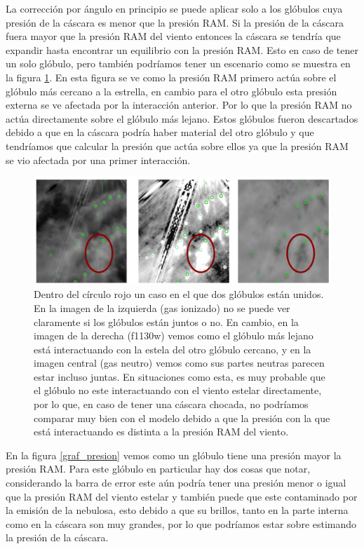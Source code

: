 \documentclass{book}
\begin{document}
La corrección por ángulo en principio se puede aplicar solo a los glóbulos cuya presión de la cáscara  es menor que la presión RAM. Si la presión de la cáscara fuera mayor que la presión RAM del viento entonces la cáscara se tendría que expandir hasta encontrar un equilibrio con la presión RAM. Esto en caso de tener un solo glóbulo, pero también podríamos tener un escenario como se muestra en la figura \ref{fig:multiples_glo}. En esta figura se ve como la presión RAM primero actúa sobre el glóbulo más cercano a la estrella, en cambio para el otro glóbulo esta presión externa se ve afectada por la interacción anterior. Por lo que la presión RAM no actúa directamente sobre el glóbulo más lejano. Estos glóbulos fueron descartados debido a que en la cáscara podría haber material del otro glóbulo y que tendríamos que calcular la presión que actúa sobre ellos ya que la presión RAM se vio afectada por una primer interacción.\\

\begin{figure}[htb]
    \centering
    \includegraphics[width=\textwidth]{Nuevas imagenes finales/multiples_glo.pdf}
    \caption{Dentro del círculo rojo un caso en el que dos glóbulos están unidos. En la imagen de la izquierda (gas ionizado) no se puede ver claramente si los glóbulos están juntos o no.  En cambio, en la imagen de la derecha (f1130w) vemos como el glóbulo más lejano está interactuando con la estela del otro glóbulo cercano, y en la imagen central (gas neutro) vemos como sus partes neutras parecen estar incluso juntas. En situaciones como esta, es muy probable que el glóbulo no este interactuando con el viento estelar directamente, por lo que, en caso de tener una cáscara chocada, no podríamos comparar muy bien con el modelo debido a que la presión con la que está interactuando es distinta a la presión RAM del viento.}
    \label{fig:multiples_glo}
\end{figure}

En la figura \ref{graf_presion} vemos como un glóbulo tiene una presión mayor la presión RAM. Para este glóbulo en particular hay dos cosas que notar, considerando la barra de error este aún podría tener una presión menor o igual que la presión RAM del viento estelar y también puede que este contaminado por la emisión de la nebulosa, esto debido a que su brillos, tanto en la parte interna como en la cáscara son muy grandes, por lo que podríamos estar sobre estimando la presión de la cáscara.\\
\end{document}
